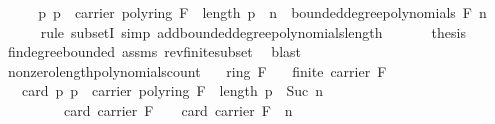 \begin{isabellebody}
%
\isadelimproof
%
\endisadelimproof
%
\isatagproof
{}\isamarkupfalse%
\ {\isacharminus}{\kern0pt}\isanewline
\ \ \isamarkupfalse%
\ {\isachardoublequoteopen}{\isacharbraceleft}{\kern0pt}p{\isachardot}{\kern0pt}\ p\ {\isasymin}\ carrier\ {\isacharparenleft}{\kern0pt}poly{\isacharunderscore}{\kern0pt}ring\ F{\isacharparenright}{\kern0pt}\ {\isasymand}\ length\ p\ {\isacharequal}{\kern0pt}\ n{\isacharbraceright}{\kern0pt}\ {\isasymsubseteq}\ bounded{\isacharunderscore}{\kern0pt}degree{\isacharunderscore}{\kern0pt}polynomials\ F\ n{\isachardoublequoteclose}\isanewline
\ \ \ \ \isamarkupfalse%
\ {\isacharparenleft}{\kern0pt}rule\ subsetI{\isacharcomma}{\kern0pt}\ simp\ add{\isacharcolon}{\kern0pt}bounded{\isacharunderscore}{\kern0pt}degree{\isacharunderscore}{\kern0pt}polynomials{\isacharunderscore}{\kern0pt}length{\isacharparenright}{\kern0pt}\ \isanewline
\ \ \isamarkupfalse%
\ \isamarkupfalse%
\ {\isacharquery}{\kern0pt}thesis\isanewline
\ \ \isamarkupfalse%
\ fin{\isacharunderscore}{\kern0pt}degree{\isacharunderscore}{\kern0pt}bounded\ assms\ rev{\isacharunderscore}{\kern0pt}finite{\isacharunderscore}{\kern0pt}subset\ \isamarkupfalse%
\ blast\isanewline
{}\isamarkupfalse%
%
\endisatagproof
{\isafoldproof}%
%
\isadelimproof
\isanewline
%
\endisadelimproof
\isanewline
{}\isamarkupfalse%
\ nonzero{\isacharunderscore}{\kern0pt}length{\isacharunderscore}{\kern0pt}polynomials{\isacharunderscore}{\kern0pt}count{\isacharcolon}{\kern0pt}\isanewline
\ \ \ {\isachardoublequoteopen}ring\ F{\isachardoublequoteclose}\isanewline
\ \ \ {\isachardoublequoteopen}finite\ {\isacharparenleft}{\kern0pt}carrier\ F{\isacharparenright}{\kern0pt}{\isachardoublequoteclose}\isanewline
\ \ \ {\isachardoublequoteopen}card\ {\isacharbraceleft}{\kern0pt}p{\isachardot}{\kern0pt}\ p\ {\isasymin}\ carrier\ {\isacharparenleft}{\kern0pt}poly{\isacharunderscore}{\kern0pt}ring\ F{\isacharparenright}{\kern0pt}\ {\isasymand}\ length\ p\ {\isacharequal}{\kern0pt}\ Suc\ n{\isacharbraceright}{\kern0pt}\ \isanewline
\ \ \ \ \ \ \ \ {\isacharequal}{\kern0pt}\ {\isacharparenleft}{\kern0pt}card\ {\isacharparenleft}{\kern0pt}carrier\ F{\isacharparenright}{\kern0pt}\ {\isacharminus}{\kern0pt}\ {}{\isacharparenright}{\kern0pt}\ {\isacharasterisk}{\kern0pt}\ card\ {\isacharparenleft}{\kern0pt}carrier\ F{\isacharparenright}{\kern0pt}\ {\isacharcircum}{\kern0pt}\ n{\isachardoublequoteclose}\isanewline

\end{isabellebody}
